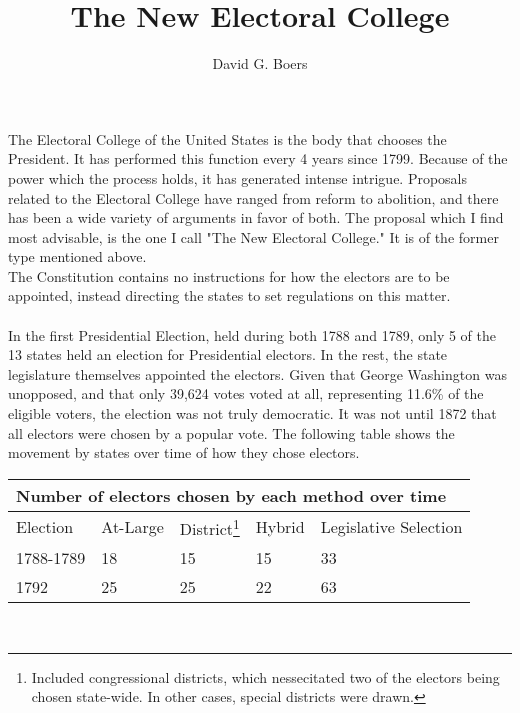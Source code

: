 \documentclass{article}
\title{The New Electoral College}
\author{David G. Boers}
\begin{document}
    \maketitle
    The Electoral College of the United States is the body that chooses the President. It has performed this function every 4 years since 1799. Because of the power which the process holds, it has generated intense intrigue. Proposals related to the Electoral College have ranged from reform to abolition, and there has been a wide variety of arguments in favor of both. The proposal which I find most advisable, is the one I call "The New Electoral College." It is of the former type mentioned above.\\
    
    The Constitution contains no instructions for how the electors are to be appointed, instead directing the states to set regulations on this matter.\\

    \\

    In the first Presidential Election, held during both 1788 and 1789, only 5 of the 13 states held an election for Presidential electors. In the rest, the state legislature themselves appointed the electors. Given that George Washington was unopposed, and that only 39,624 votes voted at all, representing 11.6\% of the eligible voters, the election was not truly democratic. It was not until 1872 that all electors were chosen by a popular vote. The following table shows the movement by states over time of how they chose electors.\\

    \begin{adjustbox}{center}
    \begin{tabular}{ |l|l|l|l|l| }
        \multicolumn{5}{|l|}{Number of electors chosen by each method over time} \\
        \hline
        Election & At-Large & District\footnote{Included congressional districts, which nessecitated two of the electors being chosen state-wide. In other cases, special districts were drawn.} & Hybrid & Legislative Selection \\
        \hline
        1788-1789 & 18 & 15 & 15 & 33 \\
        1792 & 25 & 25 & 22 & 63
    \end{tabular}
    \end{adjustbox} \\
\end{document}

